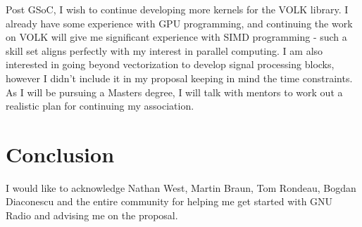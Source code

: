 \documentclass[a4paper,12pt,oneside]{article}
\begin{document}
Post GSoC, I wish to continue developing more kernels for the VOLK library. I already have some experience with GPU programming, and continuing the work on VOLK will give me significant experience with SIMD programming - such a skill set aligns perfectly with my interest in parallel computing. I am also interested in going beyond vectorization to develop signal processing blocks, however I didn't include it in my proposal keeping in mind the time constraints. As I will be pursuing a Masters degree, I will talk with mentors to work out a realistic plan for continuing my association.
 
\section{Conclusion}
I would like to acknowledge Nathan West, Martin Braun, Tom Rondeau, Bogdan Diaconescu and the entire community for helping me get started with GNU Radio and advising me on the proposal. 

\newpage

\end{document}
